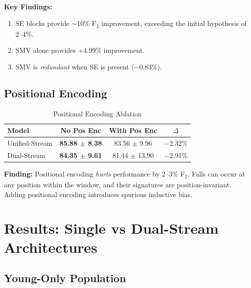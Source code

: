 \documentclass[journal,12pt]{IEEEtran}
\newcommand{\best}[1]{\textbf{\textcolor{bestresult}{#1}}}
\newcommand{\fone}{F\textsubscript{1}}
\begin{document}
\textbf{Key Findings:}
\begin{enumerate}
    \item SE blocks provide $\sim$10\% \fone{} improvement, exceeding the initial hypothesis of 2--4\%.
    \item SMV alone provides +4.99\% improvement.
    \item SMV is \emph{redundant} when SE is present ($-$0.83\%).
\end{enumerate}

\subsection{Positional Encoding}

\begin{table}[htbp]
\centering
\caption{Positional Encoding Ablation}
\label{tab:posenc}
\begin{tabular}{@{}lccc@{}}
\toprule
\textbf{Model} & \textbf{No Pos Enc} & \textbf{With Pos Enc} & $\Delta$ \\
\midrule
Unified-Stream & \best{85.88 $\pm$ 8.38} & 83.56 $\pm$ 9.96 & $-$2.32\% \\
Dual-Stream & \best{84.35 $\pm$ 9.61} & 81.44 $\pm$ 13.90 & $-$2.91\% \\
\bottomrule
\end{tabular}
\end{table}

\textbf{Finding:} Positional encoding \emph{hurts} performance by 2--3\% \fone{}. Falls can occur at any position within the window, and their signatures are position-invariant. Adding positional encoding introduces spurious inductive bias.


\section{Results: Single vs Dual-Stream Architectures}
\label{sec:stream}

\subsection{Young-Only Population}
\end{document}
